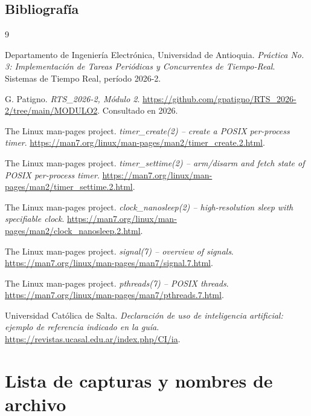 \documentclass[12pt,a4paper]{article}
\begin{document}
\subsection{Bibliografía}

\begin{thebibliography}{9}

Departamento de Ingeniería Electrónica, Universidad de Antioquia.
\textit{Práctica No. 3: Implementación de Tareas Periódicas y Concurrentes de Tiempo-Real}.
Sistemas de Tiempo Real, período 2026-2.

G. Patigno.
\textit{RTS\_2026-2, Módulo 2}.
\url{https://github.com/gpatigno/RTS_2026-2/tree/main/MODULO2}.
Consultado en 2026.

The Linux man-pages project.
\textit{timer\_create(2) -- create a POSIX per-process timer}.
\url{https://man7.org/linux/man-pages/man2/timer_create.2.html}.

The Linux man-pages project.
\textit{timer\_settime(2) -- arm/disarm and fetch state of POSIX per-process timer}.
\url{https://man7.org/linux/man-pages/man2/timer_settime.2.html}.

The Linux man-pages project.
\textit{clock\_nanosleep(2) -- high-resolution sleep with specifiable clock}.
\url{https://man7.org/linux/man-pages/man2/clock_nanosleep.2.html}.

The Linux man-pages project.
\textit{signal(7) -- overview of signals}.
\url{https://man7.org/linux/man-pages/man7/signal.7.html}.

The Linux man-pages project.
\textit{pthreads(7) -- POSIX threads}.
\url{https://man7.org/linux/man-pages/man7/pthreads.7.html}.

Universidad Católica de Salta.
\textit{Declaración de uso de inteligencia artificial: ejemplo de referencia indicado en la guía}.
\url{https://revistas.ucasal.edu.ar/index.php/CI/ia}.

\end{thebibliography}

\appendix
\section{Lista de capturas y nombres de archivo}
\end{document}
